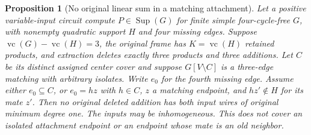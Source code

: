 \documentclass[11pt]{article}
\newcommand{\Sup}{\operatorname{Sup}}
\newcommand{\vc}{\operatorname{vc}}
\newtheorem{proposition}[theorem]{Proposition}
\theoremstyle{definition}
\theoremstyle{remark}
\begin{document}
\begin{proposition}[No original linear sum in a matching attachment]\label{prop:matchinglinearsum}
Let a positive variable-input circuit compute $P\in\Sup(G)$ for finite simple four-cycle-free $G$, with nonempty quadratic support $H$ and four missing edges. Suppose $\vc(G)-\vc(H)=3$, the original frame has $K=\vc(H)$ retained products, and extraction deletes exactly three products and three additions. Let $C$ be its distinct assigned center cover and suppose $G[V\setminus C]$ is a three-edge matching with arbitrary isolates. Write $e_0$ for the fourth missing edge. Assume either $e_0\subseteq C$, or $e_0=hz$ with $h\in C$, $z$ a matching endpoint, and $hz'\notin H$ for its mate $z'$. Then no original deleted addition has both input wires of original minimum degree one. The inputs may be inhomogeneous. This does not cover an isolated attachment endpoint or an endpoint whose mate is an old neighbor.
\end{proposition}
\end{document}
